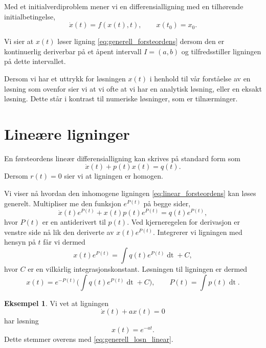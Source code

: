 \documentclass{article}
\theoremstyle{plain}
\theoremstyle{definition}
\newtheorem{eksempel}[teorem]{Eksempel}
\theoremstyle{remark}
\newcommand{\diff}[1]{\mathop{d#1}}
\newcommand{\fcn}{x}
\newcommand{\expfcn}[1]{e^{#1}}
\newcommand{\biggparanth}[1]{\bigg(#1\bigg)}
\begin{document}
Med et initialverdiproblem mener vi en differensialligning med en tilhørende initialbetingelse,
\begin{equation*}
    \dot{x}(t) = f(\fcn(t), t), \qquad x(t_0) = x_0.
\end{equation*}

Vi sier at $\fcn(t)$ løser ligning \eqref{eq:generell_forsteordens} dersom den er kontinuerlig deriverbar på et åpent intervall $I = (a, b)$ og tilfredsstiller ligningen på dette intervallet.

Dersom vi har et uttrykk for løsningen $\fcn(t)$ i henhold til vår forståelse av en løsning som ovenfor sier vi at vi ofte at vi har en analytisk løsning, eller en eksakt løsning. Dette står i kontrast til numeriske løsninger, som er tilnærminger.


\section*{Lineære ligninger}

En førsteordens lineær differensialligning kan skrives på standard form som
\begin{equation} \label{eq:linear_forsteordens}
    \dot{\fcn}(t) + p(t) \fcn(t) = q(t).
\end{equation}
Dersom $r(t) = 0$ sier vi at ligningen er homogen.

Vi viser nå hvordan den inhomogene ligningen \eqref{eq:linear_forsteordens} kan løses generelt. Multipliser me den funksjon $\expfcn{P(t)}$ på begge sider,
\begin{equation*}
    \dot{\fcn}(t) \expfcn{P(t)} + \fcn(t) p(t) \expfcn{P(t)} = q(t) \expfcn{P(t)},
\end{equation*}
hvor $P(t)$ er en antiderivert til $p(t)$. Ved kjerneregelen for derivasjon er venstre side nå lik den deriverte av $\fcn(t) \expfcn{P(t)}$. Integrerer vi ligningen med hensyn på $t$ får vi dermed
\begin{equation*}
    \fcn(t) \expfcn{P(t)} = \int q(t) \expfcn{P(t)} \diff{t} + C, 
\end{equation*}
hvor $C$ er en vilkårlig integrasjonskonstant. Løsningen til ligningen er dermed
\begin{equation} \label{eq:generell_losn_linear}
    \fcn(t) = \expfcn{-P(t)} \biggparanth{\int q(t) \expfcn{P(t)} \diff{t} + C}, \qquad P(t) = \int p(t) \diff{t}.
\end{equation}

\begin{eksempel}
    Vi vet at ligningen
    \begin{equation*}
        \dot{\fcn}(t) + a \fcn(t) = 0
    \end{equation*}
    har løsning
    \begin{equation*}
        \fcn(t) = \expfcn{-a t}.
    \end{equation*}
    Dette stemmer overens med \eqref{eq:generell_losn_linear}.
\end{eksempel}
\end{document}
